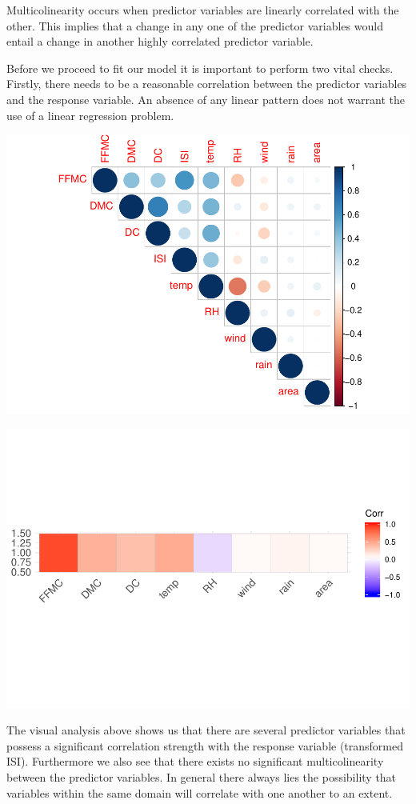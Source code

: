 \documentclass[conference,final,]{IEEEtran}
\makeatletter
\def\maxwidth{\ifdim\Gin@nat@width>\linewidth\linewidth
\else\Gin@nat@width\fi}
\let\Oldincludegraphics\includegraphics
\renewcommand{\includegraphics}[1]{\Oldincludegraphics[width=\maxwidth]{#1}}
\makeatother
\begin{document}
Multicolinearity occurs when predictor variables are linearly correlated
with the other. This implies that a change in any one of the predictor
variables would entail a change in another highly correlated predictor
variable.

Before we proceed to fit our model it is important to perform two vital
checks. Firstly, there needs to be a reasonable correlation between the
predictor variables and the response variable. An absence of any linear
pattern does not warrant the use of a linear regression problem.

\includegraphics{forest_fires_files/figure-latex/unnamed-chunk-3-1.pdf}

\includegraphics{forest_fires_files/figure-latex/analysis-1.pdf}

The visual analysis above shows us that there are several predictor
variables that possess a significant correlation strength with the
response variable (transformed ISI). Furthermore we also see that there
exists no significant multicolinearity between the predictor variables.
In general there always lies the possibility that variables within the
same domain will correlate with one another to an extent.
\end{document}
